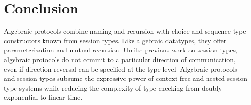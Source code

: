 \section{Conclusion}
\label{sec:conclusion}

Algebraic protocols combine naming and recursion with choice %
and sequence type constructors known from session types. Like algebraic datatypes,
they offer parameterization and mutual recursion. Unlike previous work on
session types, algebraic
protocols do not commit to a particular direction of communication,
even if direction reversal can be specified at the type level. Algebraic protocols
and session types subsume the expressive power of context-free and nested
session type systems while reducing the complexity of type checking
from doubly-exponential to linear time.

